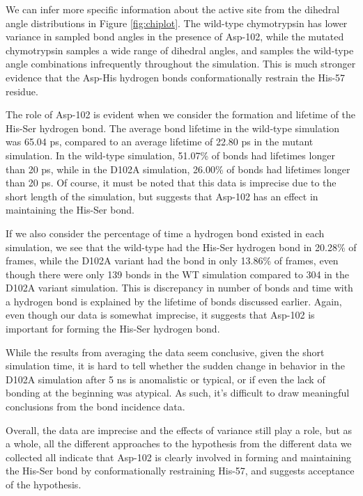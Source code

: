 \documentclass[11pt, twocolumn]{article}
\begin{document}
We can infer more specific information about the active site from the dihedral
angle distributions in Figure \ref{fig:chiplot}. The wild-type chymotrypsin
has lower variance in sampled bond angles in the presence of Asp-102, while
the mutated chymotrypsin samples a wide range of dihedral angles, and
samples the wild-type angle combinations infrequently throughout the simulation.
This is much stronger evidence that the Asp-His hydrogen bonds conformationally
restrain the His-57 residue.

The role of Asp-102 is evident when we consider the formation and lifetime
of the His-Ser hydrogen bond. The average bond lifetime in the wild-type
simulation was 65.04 ps, compared to an average lifetime of 22.80 ps in the
mutant simulation. In the wild-type simulation, 51.07\% of bonds had lifetimes
longer than 20 ps, while in the D102A simulation, 26.00\% of bonds had lifetimes
longer than 20 ps. Of course, it must be noted that this data is imprecise
due to the short  length of the simulation, but suggests that Asp-102 has an
effect in maintaining the His-Ser bond.

If we also consider the percentage of time a hydrogen bond existed in each
simulation, we see that the wild-type had the His-Ser hydrogen bond in
20.28\% of frames, while the D102A variant had the bond in only 13.86\% of
frames, even though there were only 139 bonds in the WT simulation compared
to 304 in the D102A variant simulation. This is discrepancy in number of bonds
and time with a hydrogen bond is explained by the lifetime of bonds discussed
earlier. Again, even though our data is somewhat imprecise, it suggests that
Asp-102 is important for forming the His-Ser hydrogen bond.

While the results from averaging the data seem conclusive, given the short
simulation time, it is hard to tell whether the sudden change in behavior
in the D102A simulation after 5 ns is anomalistic or typical, or if even
the lack of bonding at the beginning was atypical. As such, it's difficult
to draw meaningful conclusions from the bond incidence data.

Overall, the data are imprecise and the effects of variance still play a role,
but as a whole, all the different approaches to the hypothesis from the
different data we collected all indicate that Asp-102 is clearly involved in
forming and maintaining the His-Ser bond by conformationally restraining
His-57, and suggests acceptance of the hypothesis.
\end{document}
